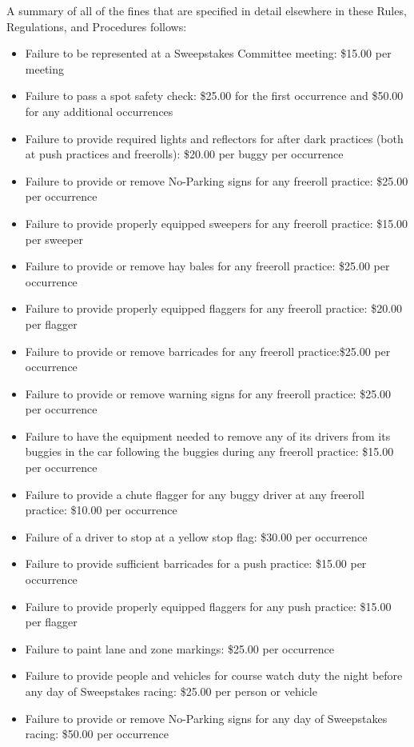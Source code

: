 \documentclass[openany]{book}
\begin{document}
A summary of all of the fines that are specified in detail elsewhere in these Rules, Regulations, and Procedures follows:
\begin{itemize}
	\item Failure to be represented at a Sweepstakes Committee meeting: \$15.00 per meeting
	\item Failure to pass a spot safety check: \$25.00 for the first occurrence and \$50.00 for any additional occurrences
	\item Failure to provide required lights and reflectors for after dark practices (both at push practices and freerolls): \$20.00 per buggy per occurrence
	\item Failure to provide or remove No-Parking signs for any freeroll practice: \$25.00 per occurrence
	\item Failure to provide properly equipped sweepers for any freeroll practice: \$15.00 per sweeper
	\item Failure to provide or remove hay bales for any freeroll practice: \$25.00 per occurrence
	\item Failure to provide properly equipped flaggers for any freeroll practice: \$20.00 per flagger
	\item Failure to provide or remove barricades for any freeroll practice:\$25.00 per occurrence
	\item Failure to provide or remove warning signs for any freeroll practice: \$25.00 per occurrence
	\item Failure to have the equipment needed to remove any of its drivers from its buggies in the car following the buggies during any freeroll practice: \$15.00 per occurrence
	\item Failure to provide a chute flagger for any buggy driver at any freeroll practice: \$10.00 per occurrence
	\item Failure of a driver to stop at a yellow stop flag: \$30.00 per occurrence
	\item Failure to provide sufficient barricades for a push practice: \$15.00 per occurrence
	\item Failure to provide properly equipped flaggers for any push practice: \$15.00 per flagger
	\item Failure to paint lane and zone markings: \$25.00 per occurrence
	\item Failure to provide people and vehicles for course watch duty the night before any day of Sweepstakes racing: \$25.00 per person or vehicle
	\item Failure to provide or remove No-Parking signs for any day of Sweepstakes racing: \$50.00 per occurrence

\end{itemize}
\end{document}
